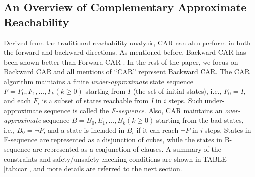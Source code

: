 \iffalse
In the CAR algorithm, A is usually an explicit state and B is $T \bigwedge B_{i}$, where $T$ is the transition system of $Sys=(V,I,T)$ and $B_{i}$ is the \textit{i}-th level of B-sequence(will describe in below).

A SAT call like $\mathit{SAT}(A,B)$ will have two possible outcomes: 

1.satisfied, we will then use \textbf{get\_assignment()} to get a satisfying assignment to literals in A and B. 

2.unsatisfied, we will then use \textbf{get\_unsat\_core()} to get an unsatisfiable core c that $ c \subseteq A $ and $ c \bigwedge T $ is unsatisfiable.


In mathematical logic, given an unsatisfiable Boolean propositional formula in conjunctive normal form, like $\mathit{SAT}(A,B)$, if the outcome is unsatisfied, a subset of clauses whose conjunction is still unsatisfiable is called an unsatisfiable core of the original formula. In the CAR algorithm, the unsatisfiable core comes from the assumption which means it only contains some of the literals from the assumption. For example, given an unsatisfied SAT call $\mathit{SAT}(A,B)$, where A is a conjunction of literals $A=l_{1}\cap l_{2}\cap l_{3}\cap ...\cap l_{n}$ and B is a conjunction of clause $B=c_{1}\cap c_{2}\cap...\cap c_{m}$. The obtained unsatisfiable core will be $u_{1}\cap u_{2}\cap...\cap u_{j} \quad u_{i}\in A \,(1\leq i\leq j)$.
\fi

\subsection{An Overview of Complementary Approximate Reachability}

Derived from the traditional reachability analysis, CAR can also perform in both the forward and backward directions. 
As mentioned before, Backward CAR has been shown better than Forward CAR \cite{LDPRV18}. In the rest of the paper, we focus on Backward CAR and all mentions of ``CAR'' represent Backward CAR. 
The CAR algorithm maintains a finite \emph{under-approximate} state sequence $F=F_{0},F_{1},...,F_{k} (k\geq 0)$  starting from $I$  (the set of initial states), i.e., $F_{0}=I$,  and each $F_{i}$ is a  subset of states reachable from $I$ in $i$ steps. Such under-approximate sequence is called the \emph{F-sequence}. Also, CAR maintains an \emph{over-approximate} sequence $B = B_{0},B_{1},...,B_{k} (k\geq 0)$ starting from the bad states, i.e., $B_{0}=\neg P$, and a state is included in $B_{i}$ if it can reach $\neg P$ in $i$ steps. States in F-sequence are represented as a disjunction of cubes, while the states in B-sequence are represented as a conjunction of clauses. A summary of the constraints and safety/unsafety checking conditions are shown in TABLE \ref{tab:car}, and more details are referred to the next section.

